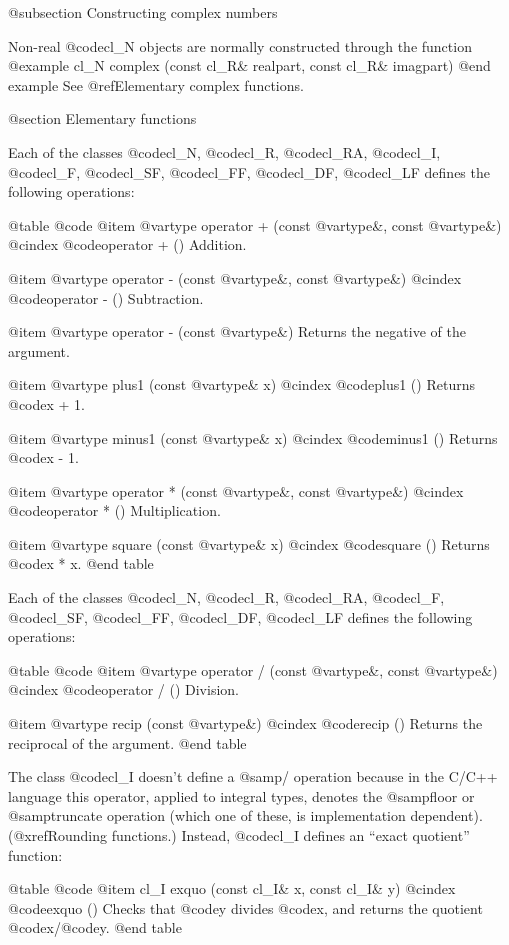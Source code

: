 @subsection Constructing complex numbers

Non-real @code{cl_N} objects are normally constructed through the function
@example
   cl_N complex (const cl_R& realpart, const cl_R& imagpart)
@end example
See @ref{Elementary complex functions}.


@section Elementary functions

Each of the classes @code{cl_N}, @code{cl_R}, @code{cl_RA}, @code{cl_I},
@code{cl_F}, @code{cl_SF}, @code{cl_FF}, @code{cl_DF}, @code{cl_LF}
defines the following operations:

@table @code
@item @var{type} operator + (const @var{type}&, const @var{type}&)
@cindex @code{operator + ()}
Addition.

@item @var{type} operator - (const @var{type}&, const @var{type}&)
@cindex @code{operator - ()}
Subtraction.

@item @var{type} operator - (const @var{type}&)
Returns the negative of the argument.

@item @var{type} plus1 (const @var{type}& x)
@cindex @code{plus1 ()}
Returns @code{x + 1}.

@item @var{type} minus1 (const @var{type}& x)
@cindex @code{minus1 ()}
Returns @code{x - 1}.

@item @var{type} operator * (const @var{type}&, const @var{type}&)
@cindex @code{operator * ()}
Multiplication.

@item @var{type} square (const @var{type}& x)
@cindex @code{square ()}
Returns @code{x * x}.
@end table

Each of the classes @code{cl_N}, @code{cl_R}, @code{cl_RA},
@code{cl_F}, @code{cl_SF}, @code{cl_FF}, @code{cl_DF}, @code{cl_LF}
defines the following operations:

@table @code
@item @var{type} operator / (const @var{type}&, const @var{type}&)
@cindex @code{operator / ()}
Division.

@item @var{type} recip (const @var{type}&)
@cindex @code{recip ()}
Returns the reciprocal of the argument.
@end table

The class @code{cl_I} doesn't define a @samp{/} operation because
in the C/C++ language this operator, applied to integral types,
denotes the @samp{floor} or @samp{truncate} operation (which one of these,
is implementation dependent). (@xref{Rounding functions}.)
Instead, @code{cl_I} defines an ``exact quotient'' function:

@table @code
@item cl_I exquo (const cl_I& x, const cl_I& y)
@cindex @code{exquo ()}
Checks that @code{y} divides @code{x}, and returns the quotient @code{x}/@code{y}.
@end table

